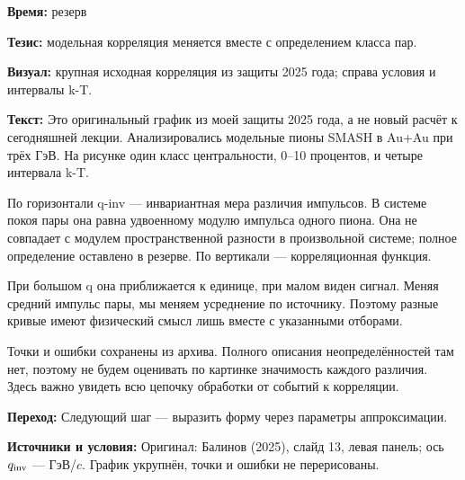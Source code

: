 \textbf{Время:} резерв

\textbf{Тезис:} модельная корреляция меняется вместе с определением класса пар.

\textbf{Визуал:} крупная исходная корреляция из защиты 2025 года; справа условия и интервалы k-T.

\textbf{Текст:} Это оригинальный график из моей защиты 2025 года, а не новый расчёт к сегодняшней лекции. Анализировались модельные пионы SMASH в Au+Au при трёх ГэВ. На рисунке один класс центральности, 0–10 процентов, и четыре интервала k-T.

По горизонтали q-inv — инвариантная мера различия импульсов. В системе покоя пары она равна удвоенному модулю импульса одного пиона. Она не совпадает с модулем пространственной разности в произвольной системе; полное определение оставлено в резерве. По вертикали — корреляционная функция.

При большом q она приближается к единице, при малом виден сигнал. Меняя средний импульс пары, мы меняем усреднение по источнику. Поэтому разные кривые имеют физический смысл лишь вместе с указанными отборами.

Точки и ошибки сохранены из архива. Полного описания неопределённостей там нет, поэтому не будем оценивать по картинке значимость каждого различия. Здесь важно увидеть всю цепочку обработки от событий к корреляции.

\textbf{Переход:} Следующий шаг — выразить форму через параметры аппроксимации.

\textbf{Источники и условия:} Оригинал: Балинов (2025), слайд 13, левая панель; ось \(q_{\rm inv}\) — ГэВ/\(c\). График укрупнён, точки и ошибки не перерисованы.
